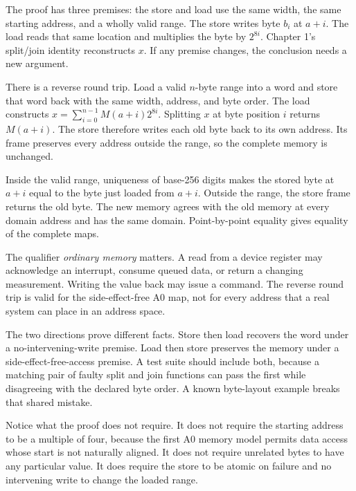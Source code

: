 \begin{proofkit}[title={\iconProofKit\ Store then load}]
The proof has three premises: the store and load use the same width, the same
starting address, and a wholly valid range. The store writes byte \(b_i\) at
\(a+i\). The load reads that same location and multiplies the byte by
\(2^{8i}\). Chapter 1's split/join identity reconstructs \(x\). If any premise
changes, the conclusion needs a new argument.
\end{proofkit}

There is a reverse round trip. Load a valid \(n\)-byte range into a word and
store that word back with the same width, address, and byte order. The load
constructs
\(x=\sum_{i=0}^{n-1}M(a+i)2^{8i}\). Splitting \(x\) at byte position \(i\)
returns \(M(a+i)\). The store therefore writes each old byte back to its own
address. Its frame preserves every address outside the range, so the complete
memory is unchanged.

\begin{proofkit}[title={\iconProofKit\ Load then store preserves ordinary memory}]
Inside the valid range, uniqueness of base-256 digits makes the stored byte at
\(a+i\) equal to the byte just loaded from \(a+i\). Outside the range, the
store frame returns the old byte. The new memory agrees with the old memory at
every domain address and has the same domain. Point-by-point equality gives
equality of the complete maps.
\end{proofkit}

The qualifier \emph{ordinary memory} matters. A read from a device register
may acknowledge an interrupt, consume queued data, or return a changing
measurement. Writing the value back may issue a command. The reverse round
trip is valid for the side-effect-free A0 map, not for every address that a
real system can place in an address space.

The two directions prove different facts. Store then load recovers the word
under a no-intervening-write premise. Load then store preserves the memory
under a side-effect-free-access premise. A test suite should include both,
because a matching pair of faulty split and join functions can pass the first
while disagreeing with the declared byte order. A known byte-layout example
breaks that shared mistake.

Notice what the proof does not require. It does not require the starting
address to be a multiple of four, because the first A0 memory model permits
data access whose start is not naturally aligned. It does not require unrelated bytes to have any
particular value. It does require the store to be atomic on failure and no
intervening write to change the loaded range.

